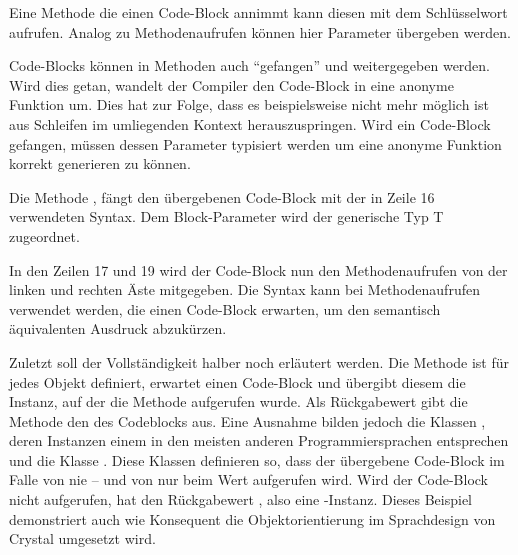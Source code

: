 Eine Methode die einen Code-Block annimmt kann diesen mit dem Schlüsselwort
 aufrufen.  Analog zu Methodenaufrufen können hier Parameter
übergeben werden.

Code-Blocks können in Methoden auch \enquote{gefangen} und weitergegeben werden.
Wird dies getan, wandelt der Compiler den Code-Block in eine anonyme Funktion
um.  Dies hat zur Folge, dass es beispielsweise nicht mehr möglich ist aus
Schleifen im umliegenden Kontext herauszuspringen.  Wird ein Code-Block
gefangen, müssen dessen Parameter typisiert werden um eine anonyme Funktion
korrekt generieren zu können.

Die Methode , fängt den übergebenen Code-Block mit der in Zeile 16
verwendeten Syntax.  Dem Block-Parameter wird der generische Typ T
zugeordnet.

In den Zeilen 17 und 19 wird der Code-Block nun den Methodenaufrufen von
 der linken und rechten Äste mitgegeben.  Die Syntax
 kann bei Methodenaufrufen verwendet werden, die
einen Code-Block erwarten, um den semantisch äquivalenten Ausdruck
 abzukürzen.

Zuletzt soll der Vollständigkeit halber noch  erläutert werden.  Die
Methode  ist für jedes Objekt definiert, erwartet einen Code-Block und
übergibt diesem die Instanz, auf der die Methode aufgerufen wurde.  Als
Rückgabewert gibt die Methode den des Codeblocks aus.  Eine Ausnahme bilden
jedoch die Klassen , deren Instanzen einem  in den meisten
anderen Programmiersprachen entsprechen und die Klasse .  Diese
Klassen definieren  so, dass der übergebene Code-Block im Falle von
 nie -- und von  nur beim Wert  aufgerufen
wird.  Wird der Code-Block nicht aufgerufen, hat  den Rückgabewert
, also eine -Instanz.  Dieses Beispiel demonstriert auch wie
Konsequent die Objektorientierung im Sprachdesign von  Crystal umgesetzt wird.
